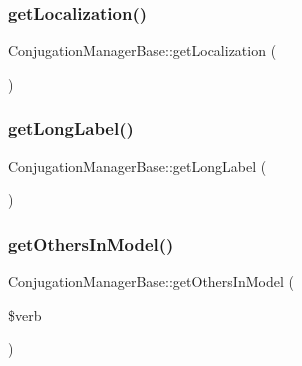 \hypertarget{class_conjugation_manager_base_a4c0cb7963519040f87daf34541f9ddb9}{}\label{class_conjugation_manager_base_a4c0cb7963519040f87daf34541f9ddb9} 
\subsubsection{\texorpdfstring{get\+Localization()}{getLocalization()}}
{\footnotesize\ttfamily Conjugation\+Manager\+Base\+::get\+Localization (\begin{DoxyParamCaption}{ }\end{DoxyParamCaption})}

\hypertarget{class_conjugation_manager_base_adc1333ad8b45b63d63424c2b6754e8f5}{}\label{class_conjugation_manager_base_adc1333ad8b45b63d63424c2b6754e8f5} 
\subsubsection{\texorpdfstring{get\+Long\+Label()}{getLongLabel()}}
{\footnotesize\ttfamily Conjugation\+Manager\+Base\+::get\+Long\+Label (\begin{DoxyParamCaption}{ }\end{DoxyParamCaption})\hspace{0.3cm}{\ttfamily [abstract]}}

\hypertarget{class_conjugation_manager_base_ac463846b6db0ebc24dbcc8ee08cf0fae}{}\label{class_conjugation_manager_base_ac463846b6db0ebc24dbcc8ee08cf0fae} 
\subsubsection{\texorpdfstring{get\+Others\+In\+Model()}{getOthersInModel()}}
{\footnotesize\ttfamily Conjugation\+Manager\+Base\+::get\+Others\+In\+Model (\begin{DoxyParamCaption}\item[{}]{\$verb }\end{DoxyParamCaption})}

